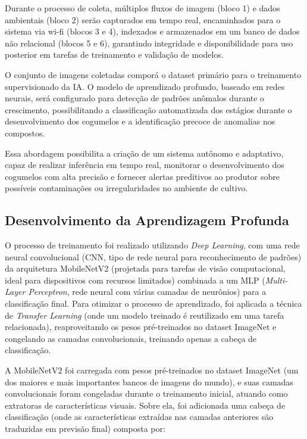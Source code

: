 \documentclass[11pt,a4paper]{article}
\begin{document}
Durante o processo de coleta, múltiplos fluxos de imagem (bloco 1) e dados ambientais (bloco 2) serão capturados em tempo real, encaminhados para o sistema via wi-fi (blocos 3 e 4), indexados e armazenados em um banco de dados não relacional (blocos 5 e 6), garantindo integridade e disponibilidade para uso posterior em tarefas de treinamento e validação de modelos.

O conjunto de imagens coletadas comporá o dataset primário para o treinamento supervisionado da IA. O modelo de aprendizado profundo, baseado em redes neurais, será configurado para detecção de padrões anômalos durante o crescimento, possibilitando a classificação automatizada dos estágios durante o desenvolvimento dos cogumelos e a identificação precoce de anomalias nos compostos.

Essa abordagem possibilita a criação de um sistema autônomo e adaptativo, capaz de realizar inferência em tempo real, monitorar o desenvolvimento dos cogumelos com alta precisão e fornecer alertas preditivos ao produtor sobre possíveis contaminações ou irregularidades no ambiente de cultivo.

\subsection{Desenvolvimento da Aprendizagem Profunda}

O processo de treinamento foi realizado utilizando \textit{Deep Learning}, com uma rede neural convolucional (CNN, tipo de rede neural para reconhecimento de padrões) da arquitetura MobileNetV2 (projetada para tarefas de visão computacional, ideal para dispositivos com recursos limitados) combinada a um MLP (\textit{Multi-Layer Perceptron}, rede neural com várias camadas de neurônios) para a classificação final. Para otimizar o processo de aprendizado, foi aplicada a técnica de \textit{Transfer Learning} (onde um modelo treinado é reutilizado em uma tarefa relacionada), reaproveitando os pesos pré-treinados no dataset ImageNet e congelando as camadas convolucionais, treinando apenas a cabeça de classificação.

A MobileNetV2 foi carregada com pesos pré-treinados no dataset ImageNet (um dos maiores e mais importantes bancos de imagens do mundo), e suas camadas convolucionais foram congeladas durante o treinamento inicial, atuando como extratoras de características visuais. Sobre ela, foi adicionada uma cabeça de classificação (onde as características extraídas nas camadas anteriores são traduzidas em previsão final) composta por:
\end{document}
